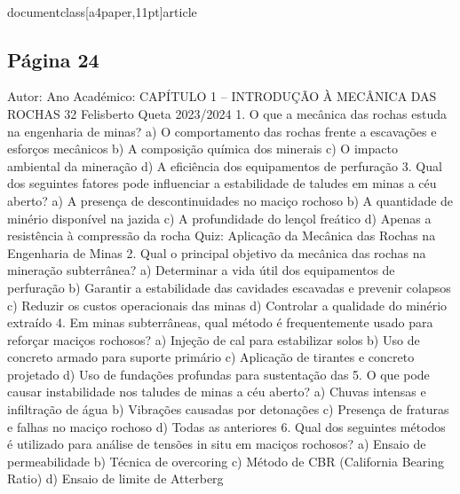 \\documentclass[a4paper,11pt]{article}
\begin{document}
\subsection*{Página 24}
Autor:
Ano Académico:
CAPÍTULO 1 – INTRODUÇÃO À MECÂNICA DAS ROCHAS
32
Felisberto Queta
2023/2024
1. O que a mecânica das rochas estuda na engenharia de minas?
a) O comportamento das rochas frente a escavações e esforços mecânicos
b) A composição química dos minerais
c) O impacto ambiental da mineração
d) A eficiência dos equipamentos de perfuração
3. Qual dos seguintes fatores pode influenciar a estabilidade de taludes em minas a céu aberto?
a) A presença de descontinuidades no maciço rochoso
b) A quantidade de minério disponível na jazida
c) A profundidade do lençol freático
d) Apenas a resistência à compressão da rocha
Quiz: Aplicação da 
Mecânica das 
Rochas na 
Engenharia de 
Minas
2. Qual o principal objetivo da mecânica das rochas na mineração subterrânea?
a) Determinar a vida útil dos equipamentos de perfuração
b) Garantir a estabilidade das cavidades escavadas e prevenir colapsos
c) Reduzir os custos operacionais das minas
d) Controlar a qualidade do minério extraído
4. Em minas subterrâneas, qual método é frequentemente usado para reforçar maciços rochosos?
a) Injeção de cal para estabilizar solos
b) Uso de concreto armado para suporte primário
c) Aplicação de tirantes e concreto projetado
d) Uso de fundações profundas para sustentação das
5. O que pode causar instabilidade nos taludes de minas a céu aberto?
a) Chuvas intensas e infiltração de água
b) Vibrações causadas por detonações
c) Presença de fraturas e falhas no maciço rochoso
d) Todas as anteriores
6. Qual dos seguintes métodos é utilizado para análise de tensões in situ em maciços rochosos?
a) Ensaio de permeabilidade
b) Técnica de overcoring
c) Método de CBR (California Bearing Ratio)
d) Ensaio de limite de Atterberg
\end{document}
